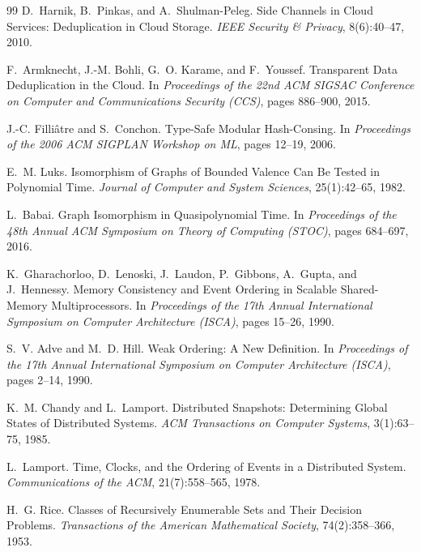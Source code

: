 \documentclass[10pt,twocolumn]{article}
\begin{document}
\begin{thebibliography}{99}
D.~Harnik, B.~Pinkas, and A.~Shulman-Peleg.
Side Channels in Cloud Services: Deduplication in Cloud Storage.
\emph{IEEE Security \& Privacy}, 8(6):40--47, 2010.

F.~Armknecht, J.-M. Bohli, G.~O. Karame, and F.~Youssef.
Transparent Data Deduplication in the Cloud.
In \emph{Proceedings of the 22nd ACM SIGSAC Conference on Computer and
Communications Security (CCS)}, pages 886--900, 2015.

J.-C. Filli\^atre and S.~Conchon.
Type-Safe Modular Hash-Consing.
In \emph{Proceedings of the 2006 ACM SIGPLAN Workshop on ML}, pages 12--19, 2006.

E.~M. Luks.
Isomorphism of Graphs of Bounded Valence Can Be Tested in Polynomial Time.
\emph{Journal of Computer and System Sciences}, 25(1):42--65, 1982.

L.~Babai.
Graph Isomorphism in Quasipolynomial Time.
In \emph{Proceedings of the 48th Annual ACM Symposium on Theory of Computing
(STOC)}, pages 684--697, 2016.

K.~Gharachorloo, D.~Lenoski, J.~Laudon, P.~Gibbons, A.~Gupta, and J.~Hennessy.
Memory Consistency and Event Ordering in Scalable Shared-Memory Multiprocessors.
In \emph{Proceedings of the 17th Annual International Symposium on Computer
Architecture (ISCA)}, pages 15--26, 1990.

S.~V. Adve and M.~D. Hill.
Weak Ordering: A New Definition.
In \emph{Proceedings of the 17th Annual International Symposium on Computer
Architecture (ISCA)}, pages 2--14, 1990.

K.~M. Chandy and L.~Lamport.
Distributed Snapshots: Determining Global States of Distributed Systems.
\emph{ACM Transactions on Computer Systems}, 3(1):63--75, 1985.

L.~Lamport.
Time, Clocks, and the Ordering of Events in a Distributed System.
\emph{Communications of the ACM}, 21(7):558--565, 1978.

H.~G. Rice.
Classes of Recursively Enumerable Sets and Their Decision Problems.
\emph{Transactions of the American Mathematical Society}, 74(2):358--366, 1953.

\end{thebibliography}
\end{document}
